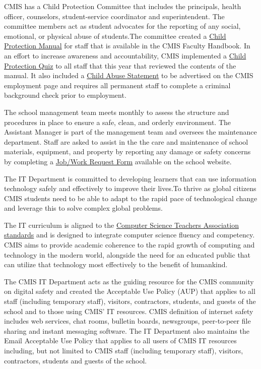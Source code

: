 \begin{findings}
CMIS has a Child Protection Committee that includes the principals, health officer, counselors, student-service coordinator and superintendent. The committee members act as student advocates for the reporting of any social, emotional, or physical abuse of students.The committee created a \href{https://docs.google.com/a/cmis.ac.th/document/d/1NtJ-Yz1ra-dug9r6BmMGqTD3tE9TFxx5W1QhBzPYlxI/edit?usp=sharing}{Child Protection Manual} for staff that is available in the CMIS Faculty Handbook. In an effort to increase awareness and accountability, CMIS implemented a \href{https://docs.google.com/a/cmis.ac.th/forms/d/185Ul5UTdsOSC8btz8CWdIvklNYs6WdPdnzb7gUrOYyM/edit}{Child Protection Quiz} to all staff that this year that reviewed the contents of the manual. It also included a \href{http://cmis.ac.th/about/employment}{Child Abuse Statement} to be advertised on the CMIS employment page and requires all permanent staff to complete a criminal background check prior to employment.

The school management team meets monthly to assess the structure and procedures in place to ensure a safe, clean, and orderly environment. The Assistant Manager is part of the management team and oversees the maintenance department. Staff are asked to assist in the the care and maintenance of school materials, equipment, and property by reporting any damage or safety concerns by completing a \href{https://docs.google.com/a/cmis.ac.th/forms/d/e/1FAIpQLSe3YhMowLuZm-HuEG2v_6M2HYfOmQJ5tQG5gB2nEAksooUQNA/viewform}{Job/Work Request Form} available on the school website.

The IT Department is committed to developing learners that can use information technology safely and effectively to improve their lives.To thrive as global citizens CMIS students need to be able to adapt to the rapid pace of technological change and leverage this to solve complex global problems.

The IT curriculum is aligned to the \href{https://www.csteachers.org/}{Computer Science Teachers Association standards} and is designed to integrate computer science fluency and competency. CMIS  aims to provide academic coherence to the rapid growth of computing and technology in the modern world, alongside the need for an educated public that can utilize that technology most effectively to the benefit of humankind.

The CMIS IT Department acts as the guiding resource for the CMIS community on digital safety and created the Acceptable Use Policy (AUP) that applies to all staff (including temporary staff), visitors, contractors, students, and guests of the school and to those using CMIS' IT resources.  CMIS definition of internet safety includes web services, chat rooms, bulletin boards, newsgroups, peer-to-peer file sharing and instant messaging software.  The IT Department also maintains the Email Acceptable Use Policy that applies to all users of CMIS IT resources including, but not limited to CMIS staff (including temporary staff), visitors, contractors, students and guests of the school.  


\end{findings}
